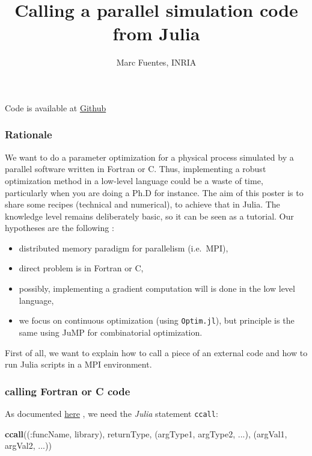 \documentclass[11pt]{article}
\author{Marc Fuentes, INRIA}
\title{Calling a parallel simulation code from Julia}
\newenvironment{Shaded}{}{}
\newcommand{\KeywordTok}[1]{\textcolor[rgb]{0.00,0.44,0.13}{\textbf{{#1}}}}
\newcommand{\NormalTok}[1]{{#1}}
\newcommand{\OperatorTok}[1]{\textcolor[rgb]{0.40,0.40,0.40}{{#1}}}
\begin{document}
    
    \maketitle
 Code is available at \href{http://github.com/aitzkora/OptimizeMPI.jl}{Github}

\hypertarget{rationale}{%
\subsubsection{Rationale}\label{rationale}}

We want to do a parameter optimization for a physical process simulated
by a parallel software written in Fortran or C. Thus, implementing a
robust optimization method in a low-level language could be a waste of
time, particularly when you are doing a Ph.D for instance. The aim of
this poster is to share some recipes (technical and numerical), to
achieve that in Julia. The knowledge level remains deliberately basic,
so it can be seen as a tutorial. Our hypotheses are the following : 
\begin{itemize}
    \item distributed memory paradigm for parallelism (i.e.~MPI),
    \item direct problem is in Fortran or C, 
    \item possibly, implementing a gradient computation will is done in the low level language,
    \item  we focus on continuous optimization (using \texttt{Optim.jl}), but principle is the same 
using JuMP for combinatorial optimization. 
\end{itemize}
First of all, we want to explain how to call a piece of an external code and how to run Julia
scripts in a MPI environment.

\hypertarget{calling-fortran-or-c-code}{%
\subsubsection{calling Fortran or C code}\label{calling-fortran-or-c-code}}

As documented \href{https://docs.julialang.org/en/v1/base/c/}{here} , we need 
the \emph{Julia} statement \texttt{ccall}: 

\begin{Shaded}
\begin{Highlighting}[]
\KeywordTok{ccall}\NormalTok{((}\OperatorTok{:}\NormalTok{funcName}\OperatorTok{,}\NormalTok{ library)}\OperatorTok{,}\NormalTok{ returnType}\OperatorTok{,}\NormalTok{ (argType1}\OperatorTok{,}\NormalTok{ argType2}\OperatorTok{,} \OperatorTok{...}\NormalTok{)}\OperatorTok{,}\NormalTok{ (argVal1}\OperatorTok{,}\NormalTok{ argVal2}\OperatorTok{,} \OperatorTok{...}\NormalTok{))}
\end{Highlighting}
\end{Shaded}
\end{document}
